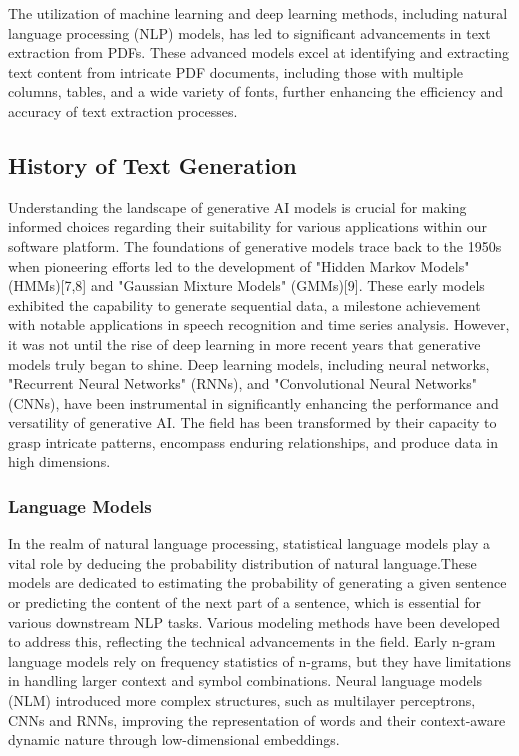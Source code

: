 \documentclass[fleqn,10pt]{thescipub} %
\begin{document}
The utilization of machine learning and deep learning methods, including natural language processing (NLP) models, has led to significant advancements in text extraction from PDFs. These advanced models excel at identifying and extracting text content from intricate PDF documents, including those with multiple columns, tables, and a wide variety of fonts, further enhancing the efficiency and accuracy of text extraction processes.

\subsection{History of Text Generation}

Understanding the landscape of generative AI models is crucial for making informed choices regarding their suitability for various applications within our software platform. The foundations of generative models trace back to the 1950s when pioneering efforts led to the development of "Hidden Markov Models" (HMMs)[7,8] and "Gaussian Mixture Models" (GMMs)[9]. These early models exhibited the capability to generate sequential data, a milestone achievement with notable applications in speech recognition and time series analysis. However, it was not until the rise of deep learning in more recent years that generative models truly began to shine. Deep learning models, including neural networks, "Recurrent Neural Networks" (RNNs), and "Convolutional Neural Networks" (CNNs), have been instrumental in significantly enhancing the performance and versatility of generative AI. The field has been transformed by their capacity to grasp intricate patterns, encompass enduring relationships, and produce data in high dimensions.

\subsubsection{Language Models}

In the realm of natural language processing, statistical language models play a vital role by deducing the probability distribution of natural language.These models are dedicated to estimating the probability of generating a given sentence or predicting the content of the next part of a sentence, which is essential for various downstream NLP tasks. Various modeling methods have been developed to address this, reflecting the technical advancements in the field. Early n-gram language models rely on frequency statistics of n-grams, but they have limitations in handling larger context and symbol combinations. Neural language models (NLM) introduced more complex structures, such as multilayer perceptrons, CNNs and RNNs, improving the representation of words and their context-aware dynamic nature through low-dimensional embeddings.
\end{document}
